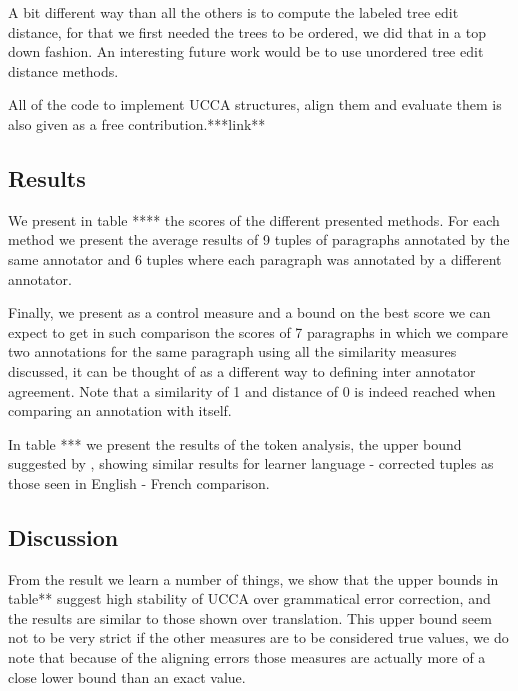 \documentclass[english]{article}
\begin{document}
A bit different way than all the others is to compute the labeled
tree edit distance\cite{zhang1989simple}, for that we first needed
the trees to be ordered, we did that in a top down fashion. An interesting
future work would be to use unordered tree edit distance methods\cite{zhang1992editing}.

All of the code to implement UCCA structures, align them and evaluate
them is also given as a free contribution.{*}{*}{*}link{*}{*}

\subsection{Results}

We present in table {*}{*}{*}{*} the scores of the different presented
methods. For each method we present the average results of 9 tuples
of paragraphs annotated by the same annotator and 6 tuples where each
paragraph was annotated by a different annotator.

Finally, we present as a control measure and a bound on the best score
we can expect to get in such comparison the scores of 7 paragraphs
in which we compare two annotations for the same paragraph using all
the similarity measures discussed, it can be thought of as a different
way to defining inter annotator agreement. Note that a similarity
of 1 and distance of 0 is indeed reached when comparing an annotation
with itself.

In table {*}{*}{*} we present the results of the token analysis, the
upper bound suggested by \cite{sulem2015conceptual}, showing similar
results for learner language - corrected tuples as those seen in English
- French comparison.

\subsection{Discussion}

From the result we learn a number of things, we show that the upper
bounds in table{*}{*} suggest high stability of UCCA over grammatical
error correction, and the results are similar to those shown over
translation. This upper bound seem not to be very strict if the other
measures are to be considered true values, we do note that because
of the aligning errors those measures are actually more of a close
lower bound than an exact value.
\end{document}
